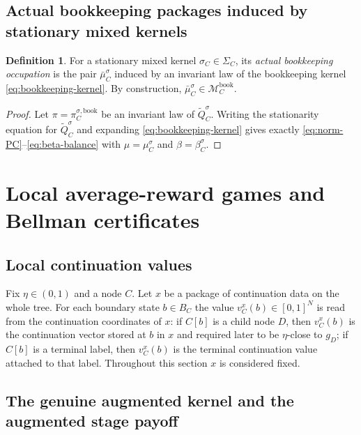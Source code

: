 \documentclass[12pt]{article}
\theoremstyle{definition}
\newtheorem{definition}[theorem]{Definition}
\newcommand{\1}{\mathbf{1}}
\newcommand{\cM}{\mathcal{M}}
\begin{document}
\subsection{Actual bookkeeping packages induced by stationary mixed kernels}

\begin{definition}
\label{def:actual-local-package}
For a stationary mixed kernel $\sigma_C\in\Sigma_C$, its \emph{actual bookkeeping
occupation} is the pair $\bar\mu_C^{\sigma}$ induced by an invariant law of the
bookkeeping kernel \eqref{eq:bookkeeping-kernel}. By construction,
$\bar\mu_C^{\sigma}\in \cM_C^{\mathrm{book}}$.
\end{definition}

\begin{proof}
Let $\pi=\pi_C^{\sigma,\mathrm{book}}$ be an invariant law of
$\widetilde Q_C^{\sigma}$. Writing the stationarity equation for
$\widetilde Q_C^{\sigma}$ and expanding \eqref{eq:bookkeeping-kernel} gives
exactly \eqref{eq:norm-PC}--\eqref{eq:beta-balance} with
$\mu=\mu_C^{\sigma}$ and $\beta=\beta_C^{\sigma}$.
\end{proof}

\section{Local average-reward games and Bellman certificates}
\label{sec:local}

\subsection{Local continuation values}

Fix $\eta\in(0,1)$ and a node $C$. Let $x$ be a package of continuation data on the
whole tree. For each boundary state $b\in B_C$ the value $v_C^x(b)\in[0,1]^N$ is
read from the continuation coordinates of $x$: if $C[b]$ is a child node $D$, then
$v_C^x(b)$ is the continuation vector stored at $b$ in $x$ and required later to
be $\eta$-close to $g_D$; if $C[b]$ is a terminal label, then $v_C^x(b)$ is the
terminal continuation value attached to that label. Throughout this section $x$ is
considered fixed.

\subsection{The genuine augmented kernel and the augmented stage payoff}
\end{document}
